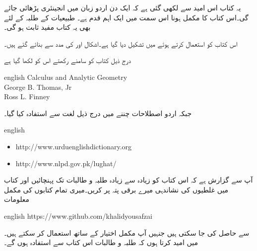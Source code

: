 یہ کتاب اس امید سے لکھی گئی ہے کہ ایک دن اردو زبان میں انجینئری پڑھائی جائے گی۔اس کتاب کا مکمل ہونا اس سمت میں ایک اہم قدم ہے۔ طبیعیات کے طلبہ کے لئے بھی یہ کتاب مفید ثابت ہو گی۔ 

اس کتاب کو  استعمال کرتے ہوئے  میں تشکیل دیا گیا ہے۔اشکال  اور  کی مدد سے بنائے گئے ہیں۔

درج ذیل کتاب کو سامنے رکھتے اس کو لکھا گیا ہے

{
\begin{otherlanguage*}{english}
Calculus and Analytic Geometry\\
George B. Thomas, Jr\\
Ross L. Finney
\end{otherlanguage*}
}

جبکہ اردو اصطلاحات چننے میں درج ذیل لغت سے استفادہ  کیا گیا۔
{
\begin{otherlanguage*}{english}
\begin{itemize}
\item
http:/\!\!/www.urduenglishdictionary.org
\item
http:/\!\!/www.nlpd.gov.pk/lughat/
\end{itemize}
\end{otherlanguage*}
}
آپ سے گزارش ہے کہ اس کتاب کو زیادہ سے زیادہ طلبہ و طالبات تک پہنچائیں اور کتاب میں غلطیوں کی نشاندہی میرے  برقی پتہ پر کریں۔میری تمام کتابوں کی مکمل  معلومات

{
\begin{otherlanguage*}{english}
https:/\!\!/www.github.com/khalidyousafzai
\end{otherlanguage*}
}

سے حاصل کی جا سکتی ہیں جنہیں آپ مکمل اختیار کے ساتھ استعمال کر سکتے ہیں۔میں امید کرتا ہوں کہ طلبہ و طالبات اس کتاب سے استفادہ ہوں گے۔
\vspace{5mm}

{}


